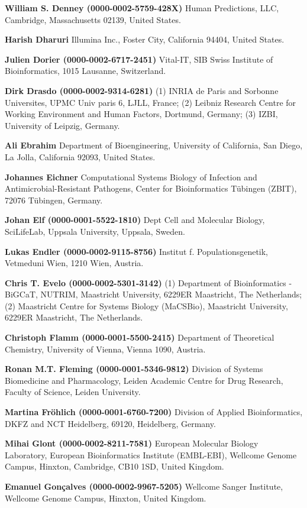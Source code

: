 \documentclass{sbml-paper}
\begin{document}
\textbf{William S. Denney (0000-0002-5759-428X)} Human Predictions, LLC, Cambridge, Massachusetts 02139, United States.

\textbf{Harish Dharuri} Illumina Inc., Foster City, California 94404, United States.

\textbf{Julien Dorier (0000-0002-6717-2451)} Vital-IT, SIB Swiss Institute of Bioinformatics, 1015 Lausanne, Switzerland.

\textbf{Dirk Drasdo (0000-0002-9314-6281)} (1) INRIA de Paris and Sorbonne Universites, UPMC Univ paris 6, LJLL, France; (2) Leibniz Research Centre for Working Environment and Human Factors, Dortmund, Germany; (3) IZBI, University of Leipzig, Germany.

\textbf{Ali Ebrahim} Department of Bioengineering, University of California, San Diego, La Jolla, California 92093, United States.

\textbf{Johannes Eichner} Computational Systems Biology of Infection and Antimicrobial-Resistant Pathogens, Center for Bioinformatics Tübingen (ZBIT), 72076 Tübingen, Germany.

\textbf{Johan Elf (0000-0001-5522-1810)} Dept Cell and Molecular Biology, SciLifeLab, Uppsala University, Uppsala, Sweden.

\textbf{Lukas Endler (0000-0002-9115-8756)} Institut f. Populationsgenetik, Vetmeduni  Wien, 1210 Wien, Austria.

\textbf{Chris T. Evelo (0000-0002-5301-3142)} (1) Department of Bioinformatics - BiGCaT, NUTRIM, Maastricht University, 6229ER Maastricht, The Netherlands; (2) Maastricht Centre for Systems Biology (MaCSBio), Maastricht University, 6229ER Maastricht, The Netherlands.

\textbf{Christoph Flamm (0000-0001-5500-2415)} Department of Theoretical Chemistry, University of Vienna, Vienna 1090, Austria.

\textbf{Ronan M.T. Fleming (0000-0001-5346-9812)} Division of Systems Biomedicine and Pharmacology, Leiden Academic Centre for Drug Research, Faculty of Science, Leiden University.

\textbf{Martina Fröhlich (0000-0001-6760-7200)} Division of Applied Bioinformatics, DKFZ and NCT Heidelberg, 69120, Heidelberg, Germany.

\textbf{Mihai Glont (0000-0002-8211-7581)} European Molecular Biology Laboratory, European Bioinformatics Institute (EMBL-EBI), Wellcome Genome Campus, Hinxton, Cambridge, CB10 1SD, United Kingdom.

\textbf{Emanuel Gonçalves (0000-0002-9967-5205)} Wellcome Sanger Institute, Wellcome Genome Campus, Hinxton, United Kingdom.
\end{document}
